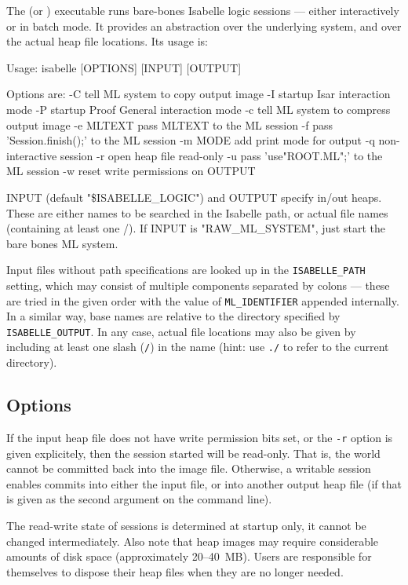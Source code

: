 The  (or ) executable runs
bare-bones Isabelle logic sessions --- either interactively or in batch mode.
It provides an abstraction over the underlying {\ML} system, and over the
actual heap file locations.  Its usage is:
\begin{ttbox}
Usage: isabelle [OPTIONS] [INPUT] [OUTPUT]

  Options are:
    -C           tell ML system to copy output image
    -I           startup Isar interaction mode
    -P           startup Proof General interaction mode
    -c           tell ML system to compress output image
    -e MLTEXT    pass MLTEXT to the ML session
    -f           pass 'Session.finish();' to the ML session
    -m MODE      add print mode for output
    -q           non-interactive session
    -r           open heap file read-only
    -u           pass 'use"ROOT.ML";' to the ML session
    -w           reset write permissions on OUTPUT

  INPUT (default "\$ISABELLE_LOGIC") and OUTPUT specify in/out heaps.
  These are either names to be searched in the Isabelle path, or
  actual file names (containing at least one /).
  If INPUT is "RAW_ML_SYSTEM", just start the bare bones ML system.
\end{ttbox}
Input files without path specifications are looked up in the
\texttt{ISABELLE_PATH} setting, which may consist of multiple components
separated by colons --- these are tried in the given order with the value of
\texttt{ML_IDENTIFIER} appended internally.  In a similar way, base names are
relative to the directory specified by \texttt{ISABELLE_OUTPUT}.  In any case,
actual file locations may also be given by including at least one slash
(\texttt{/}) in the name (hint: use \texttt{./} to refer to the current
directory).


\subsection*{Options}

If the input heap file does not have write permission bits set, or the
\texttt{-r} option is given explicitely, then the session started will be
read-only.  That is, the {\ML} world cannot be committed back into the image
file.  Otherwise, a writable session enables commits into either the input
file, or into another output heap file (if that is given as the second
argument on the command line).

The read-write state of sessions is determined at startup only, it cannot be
changed intermediately. Also note that heap images may require considerable
amounts of disk space (approximately 20--40~MB). Users are responsible for
themselves to dispose their heap files when they are no longer needed.

